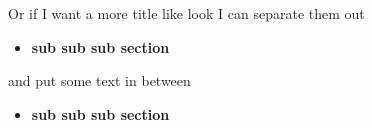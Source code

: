Or if I want a more title like look I can separate them out
\begin{itemize}[label=, leftmargin=5em]
\item \textbf{sub sub sub section}
\end{itemize}
and put some text in between
\begin{itemize}[label=, leftmargin=5em]
\item \textbf{sub sub sub section}
\end{itemize}
